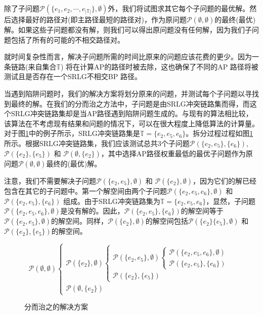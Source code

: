 除了子问题$\mathcal{P}(\{e_1,e_2,\cdots ,{e_{\left| \mathbb{T} \right|}}\},\emptyset)$外，我们将试图求其它每个子问题的最优解。然后选择最好的路径对(即主路径最短的路径对)，作为原问题$\mathcal{P}(\emptyset,\emptyset)$的最终(最优)解。如果这些子问题都没有解，则我们可以得出原问题没有任何解，因为我们子问题包括了所有的可能的不相交路径对。

就时间复杂性而言，解决子问题所需的时间比原来的问题应该花费的更少。因为一条链路(来自集合$\mathbb{T}$) 将在计算AP的路径时被去除，这也确保了不同的AP 路径将被测试且是否存在一个SRLG不相交BP 路径。

当遇到陷阱问题时，我们的解决方案将划分原来的问题，并测试每个子问题以寻找到最终的解。在我们的分而治之方法中，子问题是由SRLG冲突链路集而得，而这个SRLG冲突链路集却是当AP路径遇到陷阱问题生成的。与现有的算法相比较，该算法在不考虑现有结果和问题的情况下，可以在很大程度上降低算法的计算量。对于图\ref{fig:DividedConquer}中的例子所示，SRLG冲突链路集是$\mathbb{T}=\{e_2,e_5,e_6\}$。拆分过程过程如图\ref{fig:DividedConquer} 所示。根据SRLG冲突链路集，我们应该测试总共3个子问题${{\mathcal{P}}(\{ e_2,e_5\} ,\{ e_6\} )}$, ${{\mathcal{P}}(\{ e_2\} ,\{ e_5\} )}$ 和 ${{\mathcal{P}}(\emptyset ,\{ e_2\} )}$，其中选择AP路径权重最低的最优子问题作为原问题$\mathcal{P}(\emptyset,\emptyset)$最终的(最优)解。

注意，我们不需要解决子问题${{\mathcal{P}}(\{ e_2,e_5\}, \emptyset)}$ 和 ${{\mathcal{P}}(\{ e_2\},\emptyset )}$，因为它们的解已经包含在其它的子问题中。第一个解空间由两个子问题${{\mathcal P}(\{ e_2,e_5,e_6\} ,\emptyset )}$ 和 ${{\mathcal P}(\{ e_2,e_5\} ,\{ e_6\} )}$ 组成。由于SRLG冲突链路集为$\mathbb{T}=\{e_2,e_5,e_6\}$，显然，子问题${{\mathcal P}(\{ e_2,e_5,e_6\} ,\emptyset )}$是没有解的。因此，${{\mathcal P}(\{ e_2,e_5\} ,\{ e_6\} )}$的解空间等于${{\mathcal{P}}(\{ e_2, e_5\}, \emptyset)}$的解空间。同样，${{\mathcal{P}}(\{ e_2\},\emptyset )}$的解空间包括${{\mathcal{P}}(\{ e_2\} \{ e_5\}, \emptyset)}$  和 ${{\mathcal{P}}(\{ e_2\} ,\{ e_5\} )}$的解空间。
\begin{figure}[htbp]
\large{
\begin{equation*}
{\mathcal P}(\emptyset ,\emptyset )\left\{ {\begin{array}{*{20}{l}}
{{\mathcal P}(\{ e_2\} ,\emptyset )\left\{ {\begin{array}{*{20}{l}}
{{\mathcal P}(\{ e_2,e_5\} ,\emptyset )\left\{ {\begin{array}{*{20}{l}}
{{\mathcal P}(\{ e_2,e_5,e_6\} ,\emptyset )}\\
{\boxed{{\mathcal P}(\{ e_2,e_5\} ,\{ e_6\} )}}
\end{array}} \right.}\\
{\boxed{{\mathcal P}(\{ e_2\} ,\{ e_5\} )}}
\end{array}} \right.}\\
{\boxed{{\mathcal P}(\emptyset ,\{ e_2\} )}}
\end{array}} \right.
\end{equation*}
}
\caption{分而治之的解决方案}
\label{fig:DividedConquer}
\end{figure}




